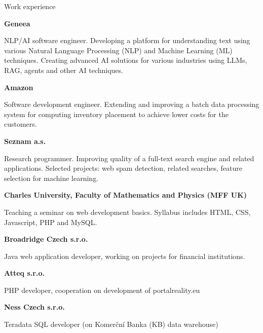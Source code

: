\begin{rubric}{Work experience}

\entry*[2014 - today]
\textbf{Geneea}

\entry*
NLP/AI software engineer. Developing a platform for understanding text using various Natural Language Processing (NLP) and Machine Learning (ML) techniques. Creating advanced AI solutions for various industries using LLMs, RAG, agents and other AI techniques.

\entry*[2012 - 2014]
\textbf{Amazon}

\entry*
Software development engineer. Extending and improving a batch data processing system for computing inventory placement to achieve lower costs for the customers. 

\entry*[2011 - 2012]
\textbf{Seznam a.s.}

\entry*
Research programmer. Improving quality of a full-text search engine and related applications. Selected projects: web spam detection, related searches, feature selection for machine learning.

\entry*[2010]
\textbf{Charles University, Faculty of Mathematics and Physics (MFF UK)}

\entry*
Teaching a seminar on web development basics. Syllabus includes HTML, CSS, Javascript, PHP and MySQL.

\entry*[2008 - 2010]
\textbf{Broadridge Czech s.r.o.}

\entry*
Java web application developer, working on projects for financial institutions.

\entry*[2008]
\textbf{Atteq s.r.o.}

\entry*
PHP developer, cooperation on development of portalreality.eu

\entry*[2007]
\textbf{Ness Czech s.r.o.}

\entry*
Teradata SQL developer (on Komerční Banka (KB) data warehouse)

\end{rubric}
